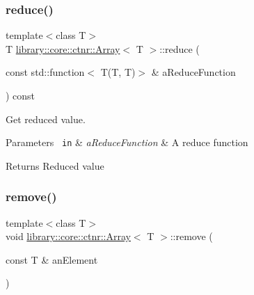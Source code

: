 \subsubsection{\texorpdfstring{reduce()}{reduce()}}
{\footnotesize\ttfamily template$<$class T$>$ \\
T \mbox{\hyperlink{classlibrary_1_1core_1_1ctnr_1_1_array}{library\+::core\+::ctnr\+::\+Array}}$<$ T $>$\+::reduce (\begin{DoxyParamCaption}\item[{const std\+::function$<$ T(T, T)$>$ \&}]{a\+Reduce\+Function }\end{DoxyParamCaption}) const}



Get reduced value. 


\begin{DoxyCode}{0}
\end{DoxyCode}



\begin{DoxyParams}[1]{Parameters}
\mbox{\texttt{ in}}  & {\em a\+Reduce\+Function} & A reduce function \\
\hline
\end{DoxyParams}
\begin{DoxyReturn}{Returns}
Reduced value 
\end{DoxyReturn}
\mbox{\label{classlibrary_1_1core_1_1ctnr_1_1_array_a8e295703797d6e41dad7a45e4101a6db}} 
\subsubsection{\texorpdfstring{remove()}{remove()}\hspace{0.1cm}{\footnotesize\ttfamily [1/2]}}
{\footnotesize\ttfamily template$<$class T$>$ \\
void \mbox{\hyperlink{classlibrary_1_1core_1_1ctnr_1_1_array}{library\+::core\+::ctnr\+::\+Array}}$<$ T $>$\+::remove (\begin{DoxyParamCaption}\item[{const T \&}]{an\+Element }\end{DoxyParamCaption})}



